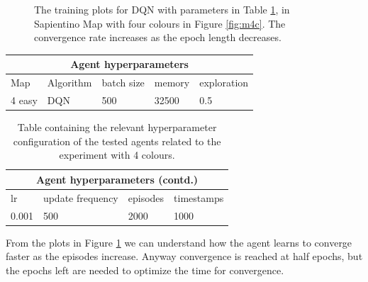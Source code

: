 \documentclass{article}
\begin{document}
\begin{figure}[h!]
  \centering
  \hfill
  \caption{The training plots for DQN with parameters in Table \ref{tab:t4}, in Sapientino Map with four colours in Figure \ref{fig:m4c}. The convergence rate increases as the epoch length decreases. }\label{fig:p4}
\end{figure}
\begin{table}[h]
\centering
\begin{tabular}{|p{1cm}|p{2cm}|p{1cm}|p{1.2cm}|p{1.7cm}||}
 \hline
 \multicolumn{5}{|c|}{Agent hyperparameters} \\
 \hline
 Map & Algorithm & batch size & memory & exploration \\
 \hline
 4 easy & DQN & 500 & 32500 & 0.5 \\
\hline
\end{tabular}
\end{table}
\begin{table}[h!]
\centering
\begin{tabular}{||p{0.8cm}|p{1cm}|p{1.2cm}|p{1.7cm}| }
 \hline
 \multicolumn{4}{|c|}{Agent hyperparameters (contd.)} \\
 \hline
lr & update frequency & episodes & timestamps\\
 \hline
 0.001 & 500 & 2000 & 1000 \\
\hline
\end{tabular}
\caption{Table containing the relevant hyperparameter configuration of the tested agents related to the experiment with 4 colours.}\label{tab:t4}
\end{table}
From the plots in Figure \ref{fig:p4} we can understand how the agent learns to converge faster as the episodes increase. Anyway convergence is reached at half epochs, but the epochs left are needed to optimize the time for convergence.
\end{document}
